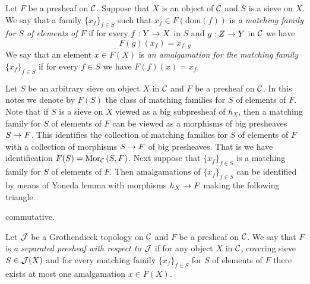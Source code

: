 \begin{definition}
Let $F$ be a presheaf on ${\mathcal C}$. Suppose that $X$ is an object of ${\mathcal C}$ and $S$ is a sieve on $X$. We say that a family $\{x_f\}_{f\in S}$ such that $x_f\in F(\mathrm{dom}(f))$ is \textit{a matching family for $S$ of elements of $F$} if for every $f:Y\rightarrow X$ in $S$ and $g:Z\rightarrow Y$ in ${\mathcal C}$ we have
$$F(g)(x_f)=x_{f\cdot g}$$
We say that an element $x\in F(X)$ is \textit{an amalgamation for the matching family} $\{x_f\}_{f\in S}$ if for every $f\in S$ we have $F(f)(x)=x_f$.
\end{definition}
\noindent
Let $S$ be an arbitrary sieve on object $X$ in ${\mathcal C}$ and $F$ be a presheaf on ${\mathcal C}$. In this notes we denote by $F(S)$ the class of matching families for $S$ of elements of $F$.\\
Note that if $S$ is a sieve on $X$ viewed as a big subpresheaf of $h_X$, then a matching family for $S$ of elements of $F$ can be viewed as a morphisms of big presheaves $S\rightarrow F$. This identifies the collection of matching families for $S$ of elements of $F$ with a collection of morphisms $S\rightarrow F$ of big presheaves. That is we have identification $F(S) = \mathrm{Mor}_{{\mathcal C}}\left(S,F\right)$. Next suppose that $\{x_f\}_{f\in S}$ is a matching family for $S$ of elements of $F$. Then amalgamations of $\{x_f\}_{f\in S}$ can be identified by means of Yoneda lemma {\cite[Theorem 3.3]{Presheaves}} with morphisms $h_X\rightarrow F$ making the following triangle
\begin{center}
\end{center}
commutative.

\begin{definition}
Let ${\mathcal J}$ be a Grothendieck topology on ${\mathcal C}$ and $F$ be a presheaf on ${\mathcal C}$. We say that $F$ is \textit{a separated presheaf with respect to ${\mathcal J}$} if for any object $X$ in ${\mathcal C}$, covering sieve $S\in {\mathcal J}(X)$ and for every matching family $\{x_f\}_{f\in S}$ for $S$ of elements of $F$ there exists at most one amalgamation $x\in F(X)$.
\end{definition} 

